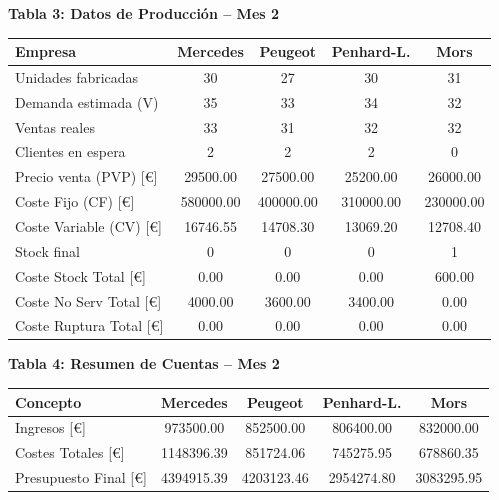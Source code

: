\documentclass{standalone}
\begin{document}
	\leavevmode
	
	\begin{minipage}{1.08\linewidth}
		\centering
		
		\textbf{Tabla 3: Datos de Producción – Mes 2}\\[0.5em]
		\begin{tabular}{@{}l
				S[table-format=2.0]
				S[table-format=2.0]
				S[table-format=2.0]
				S[table-format=2.0]@{}}
			\toprule
			\textbf{Empresa} & \textbf{Mercedes} & \textbf{Peugeot} & \textbf{Penhard-L.} & \textbf{Mors} \\
			\midrule
			Unidades fabricadas         & 30        & 27        & 30        & 31        \\
			Demanda estimada (V)        & 35        & 33        & 34        & 32        \\
			Ventas reales               & 33        & 31        & 32        & 32        \\
			Clientes en espera          & 2         & 2         & 2         & 0         \\
			Precio venta (PVP) [\euro]  & 29500.00  & 27500.00  & 25200.00  & 26000.00  \\
			Coste Fijo (CF) [\euro]     & 580000.00 & 400000.00 & 310000.00 & 230000.00 \\
			Coste Variable (CV) [\euro] & 16746.55  & 14708.30  & 13069.20  & 12708.40  \\
			Stock final                 & 0         & 0         & 0         & 1         \\
			Coste Stock Total [\euro]   & 0.00      & 0.00      & 0.00      & 600.00    \\
			Coste No Serv Total [\euro] & 4000.00   & 3600.00   & 3400.00   & 0.00      \\
			Coste Ruptura Total [\euro] & 0.00      & 0.00      & 0.00      & 0.00      \\
			\bottomrule
		\end{tabular}
		
		\vspace{2em}
		
		\textbf{Tabla 4: Resumen de Cuentas – Mes 2}\\[0.5em]
		\begin{tabular}{@{}l
				S[table-format=7.2]
				S[table-format=7.2]
				S[table-format=7.2]
				S[table-format=7.2]@{}}
			\toprule
			\textbf{Concepto} & \textbf{Mercedes} & \textbf{Peugeot} & \textbf{Penhard-L.} & \textbf{Mors} \\
			\midrule
			Ingresos [\euro]              & 973500.00  & 852500.00  & 806400.00  & 832000.00  \\
			Costes Totales [\euro]        & 1148396.39 & 851724.06  & 745275.95  & 678860.35  \\
			Presupuesto Final [\euro]     & 4394915.39 & 4203123.46 & 2954274.80 & 3083295.95 \\
			\bottomrule
		\end{tabular}
		
	\end{minipage}
\end{document}
